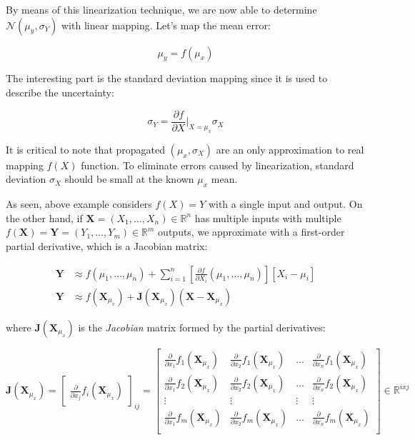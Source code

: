 \documentclass[a4paper]{report}
\numberwithin{figure}{section}
\newcommand{\R}{\mathbb{R}}
\begin{document}
\begin{appendices}
By means of this linearization technique, we are now able to determine 
$\mathcal{N}(\mu_y, \sigma_Y)$ 
with linear mapping. Let's map the mean error:

\begin{equation}
  \mu_y = f(\mu_x)
\end{equation}

The interesting part is the standard deviation mapping since it 
is used to describe the uncertainty:

\begin{equation}
  \sigma_Y = \frac{\partial f}{\partial X}\bigg|_{X=\mu_x} \sigma_X
\end{equation}

It is critical to note that propagated $(\mu_x, \sigma_X)$ are an only 
approximation to real mapping $f(X)$ function. To eliminate errors 
caused by linearization, standard deviation $\sigma_X$ 
should be small at the known $\mu_x$ mean. 

As seen, above example considers $f(X)=Y$ with a single input and output. 
On the other hand, if $\mathbf{X}=(X_1,\dots,X_n) \in \R^n$ has multiple inputs with 
multiple $f(\mathbf{X})=\mathbf{Y}=(Y_1,\dots,Y_m) \in \R^m$ outputs,
we approximate with a first-order partial derivative, which is a Jacobian 
matrix:

\begin{equation}
  \begin{aligned}
    \mathbf{Y} & \approx f(\mu_1,\dots,\mu_n) + 
    \sum_{i=1}^{n} [\frac{\partial f}{\partial X_i}(\mu_1,\dots,\mu_n)][X_i-\mu_i] \\
    \mathbf{Y} & \approx f(\mathbf{X}_{\mu_x}) + \mathbf{J}(\mathbf{X}_{\mu_x}) (\mathbf{X} - \mathbf{X}_{\mu_x})
  \end{aligned}
\end{equation}

where $\mathbf{J}(\mathbf{X}_{\mu_x})$ is the \textit{Jacobian} matrix formed by 
the partial derivatives:

\begin{equation}
  \mathbf{J}(\mathbf{X}_{\mu_x}) = \begin{bmatrix} \frac{\partial}{\partial x_j }f_i(\mathbf{X}_{\mu_x}) \end{bmatrix}_{ij} 
  = 
  \begin{bmatrix} 
    \frac{\partial}{\partial x_1}f_1(\mathbf{X}_{\mu_x}) & \frac{\partial}{\partial x_2}f_1(\mathbf{X}_{\mu_x}) & \dots & \frac{\partial}{\partial x_n}f_1(\mathbf{X}_{\mu_x}) \\
    \frac{\partial}{\partial x_1}f_2(\mathbf{X}_{\mu_x}) & \frac{\partial}{\partial x_2}f_2(\mathbf{X}_{\mu_x}) & \dots & \frac{\partial}{\partial x_n}f_2(\mathbf{X}_{\mu_x}) \\
\vdots & \vdots & \vdots & \vdots \\
    \frac{\partial}{\partial x_1}f_m(\mathbf{X}_{\mu_x}) & \frac{\partial}{\partial x_2}f_m(\mathbf{X}_{\mu_x}) & \dots & \frac{\partial}{\partial x_n}f_m(\mathbf{X}_{\mu_x}) \\
  \end{bmatrix}
  \in \R^{ixj}
\end{equation}


\end{appendices}
\end{document}
